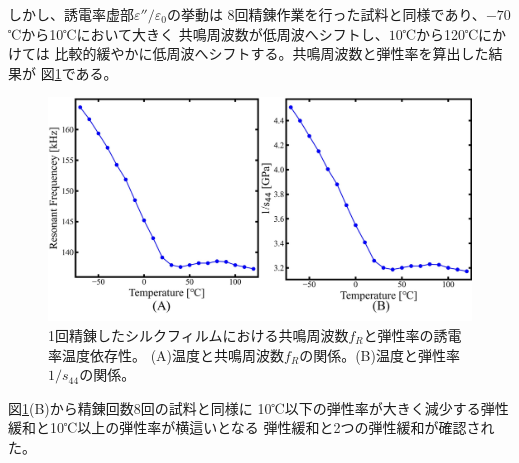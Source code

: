 \documentclass[dvipdfmx,12pt,a4paper]{jreport}
\begin{document}
			\noindent
			しかし、誘電率虚部$\varepsilon''/\varepsilon_0$の挙動は
			8回精錬作業を行った試料と同様であり、$-70$℃から10℃において大きく
			共鳴周波数が低周波へシフトし、$10$℃から120℃にかけては
			比較的緩やかに低周波へシフトする。共鳴周波数と弾性率を算出した結果が
			図\ref{1回_共鳴周波数_弾性率_温度依存性}である。
			\begin{figure}[H]
				\centering
				\includegraphics[width=\linewidth]{1回_共鳴周波数_弾性率_温度依存性.jpg}
				\caption{1回精錬したシルクフィルムにおける共鳴周波数$f_R$と弾性率の誘電率温度依存性。
				(A)温度と共鳴周波数$f_R$の関係。(B)温度と弾性率$1/s_{44}$の関係。}
				\label{1回_共鳴周波数_弾性率_温度依存性}
			\end{figure}
			\newpage
			\noindent
			図\ref{1回_共鳴周波数_弾性率_温度依存性}(B)から精錬回数8回の試料と同様に
			10℃以下の弾性率が大きく減少する弾性緩和と10℃以上の弾性率が横這いとなる
			弾性緩和と2つの弾性緩和が確認された。
\end{document}
